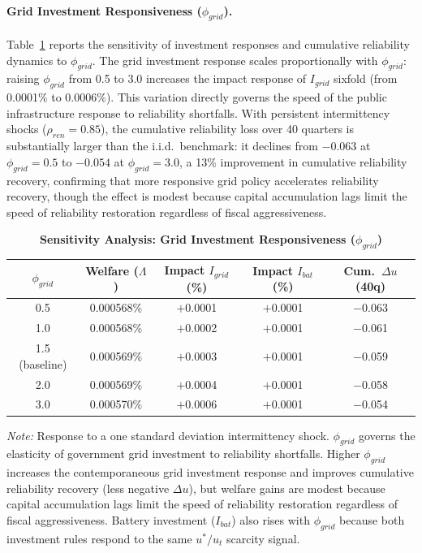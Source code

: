 \documentclass[12pt, a4paper]{article}
\begin{document}
	\paragraph{Grid Investment Responsiveness ($\phi_{grid}$).} Table~\ref{tab:phi_grid_sensitivity} reports the sensitivity of investment responses and cumulative reliability dynamics to $\phi_{grid}$. The grid investment response scales proportionally with $\phi_{grid}$: raising $\phi_{grid}$ from 0.5 to 3.0 increases the impact response of $I_{grid}$ sixfold (from 0.0001\% to 0.0006\%). This variation directly governs the speed of the public infrastructure response to reliability shortfalls. With persistent intermittency shocks ($\rho_{ren}=0.85$), the cumulative reliability loss over 40 quarters is substantially larger than the i.i.d.\ benchmark: it declines from $-0.063$ at $\phi_{grid} = 0.5$ to $-0.054$ at $\phi_{grid} = 3.0$, a 13\% improvement in cumulative reliability recovery, confirming that more responsive grid policy accelerates reliability recovery, though the effect is modest because capital accumulation lags limit the speed of reliability restoration regardless of fiscal aggressiveness.

	\begin{table}[H]
		\centering
		\caption{\textbf{Sensitivity Analysis: Grid Investment Responsiveness ($\phi_{grid}$)}}
		\label{tab:phi_grid_sensitivity}
		\renewcommand{\arraystretch}{1.3}
		\small
		\begin{tabular}{c c c c c}
			\toprule
			$\phi_{grid}$ & \textbf{Welfare ($\Lambda$)} & \textbf{Impact $I_{grid}$ (\%)} & \textbf{Impact $I_{bat}$ (\%)} & \textbf{Cum.\ $\Delta u$ (40q)} \\
			\midrule
			0.5 & 0.000568\% & $+$0.0001 & $+$0.0001 & $-$0.063 \\
			1.0 & 0.000568\% & $+$0.0002 & $+$0.0001 & $-$0.061 \\
			1.5 (baseline) & 0.000569\% & $+$0.0003 & $+$0.0001 & $-$0.059 \\
			2.0 & 0.000569\% & $+$0.0004 & $+$0.0001 & $-$0.058 \\
			3.0 & 0.000570\% & $+$0.0006 & $+$0.0001 & $-$0.054 \\
			\bottomrule
		\end{tabular}
		\vspace{0.2cm}
		\parbox{\textwidth}{\footnotesize \textit{Note:} Response to a one standard deviation intermittency shock. $\phi_{grid}$ governs the elasticity of government grid investment to reliability shortfalls. Higher $\phi_{grid}$ increases the contemporaneous grid investment response and improves cumulative reliability recovery (less negative $\Delta u$), but welfare gains are modest because capital accumulation lags limit the speed of reliability restoration regardless of fiscal aggressiveness. Battery investment ($I_{bat}$) also rises with $\phi_{grid}$ because both investment rules respond to the same $u^*/u_t$ scarcity signal.}
	\end{table}
\end{document}

